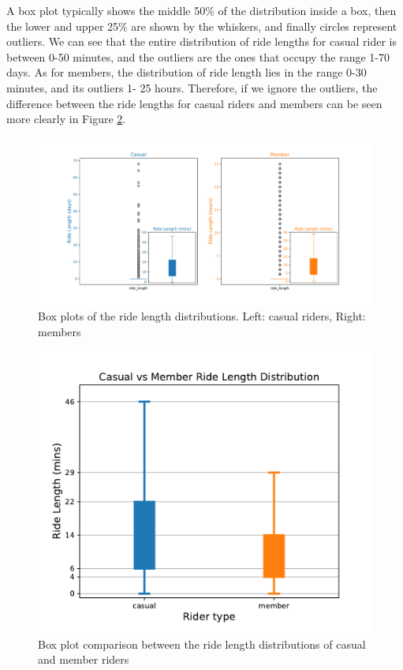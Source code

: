 \documentclass[12pt]{article}
\begin{document}
\begin{itemize}
A box plot typically shows the middle 50\% of the distribution inside a box, then the lower and upper 25\% are shown by the whiskers, and finally circles represent outliers. We can see that the entire distribution of ride lengths for casual rider is between 0-50 minutes, and the outliers are the ones that occupy the range 1-70 days. As for members, the distribution of ride length lies in the range 0-30 minutes, and its outliers 1- 25 hours. Therefore, if we ignore the outliers, the difference between the ride lengths for casual riders and members can be seen more clearly in Figure \ref{fig15}.
	
	\begin{figure}[h]
	\hspace{-0.5in}
	\includegraphics[scale=0.6]{boxplot_distribution.pdf} 
	\caption{Box plots of the ride length distributions. Left: casual riders, Right: members}
	\label{fig13}
	\end{figure}
	
	\begin{figure}[h]
	\centering
	\includegraphics[scale=0.6]{boxplot_distribution2.pdf} 
	\caption{Box plot comparison between the ride length distributions of casual and member riders}
	\label{fig15}
	\end{figure}


\end{itemize}
\end{document}
